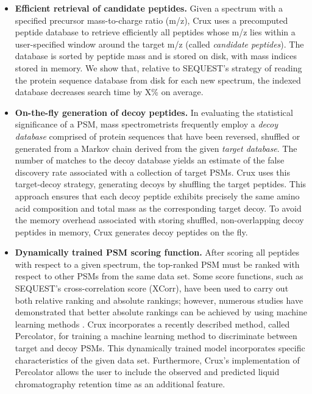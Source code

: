 \documentclass{bioinfo}
\begin{document}
\begin{itemize}

\item {\bf Efficient retrieval of candidate peptides.}  Given a
  spectrum with a specified precursor mass-to-charge ratio (m/z), Crux
  uses a precomputed peptide database to retrieve efficiently all
  peptides whose m/z lies within a user-specified window around the
  target m/z (called {\em candidate peptides}).  The database is
  sorted by peptide mass and is stored on disk, with mass indices
  stored in memory.  We show that, relative to SEQUEST's strategy of
  reading the protein sequence database from disk for each new
  spectrum, the indexed database decreases search time by X\% on
  average.

\item {\bf On-the-fly generation of decoy peptides.}  In evaluating
  the statistical significance of a PSM, mass spectrometrists
  frequently employ a {\em decoy database} comprised of protein
  sequences that have been reversed, shuffled or generated from a
  Markov chain derived from the given {\em target database}.  The
  number of matches to the decoy database yields an estimate of the
  false discovery rate associated with a collection of target PSMs.
  Crux uses this target-decoy strategy, generating decoys by shuffling
  the target peptides.  This approach ensures that each decoy peptide
  exhibits precisely the same amino acid composition and total mass as
  the corresponding target decoy.  To avoid the memory overhead
  associated with storing shuffled, non-overlapping decoy peptides in
  memory, Crux generates decoy peptides on the fly.

\item {\bf Dynamically trained PSM scoring function.}  After scoring
  all peptides with respect to a given spectrum, the top-ranked PSM
  must be ranked with respect to other PSMs from the same data set.
  Some score functions, such as SEQUEST's cross-correlation score
  (XCorr), have been used to carry out both relative ranking and
  absolute rankings; however, numerous studies have demonstrated that
  better absolute rankings can be achieved by using machine learning
  methods \cite{keller:empirical, anderson:new, elias:intensity,
  kall:semi-supervised}.  Crux incorporates a recently described
  method, called Percolator, for training a machine learning method to
  discriminate between target and decoy PSMs.  This dynamically
  trained model incorporates specific characteristics of the given
  data set.  Furthermore, Crux's implementation of Percolator allows
  the user to include the observed and predicted liquid chromatography
  retention time \cite{klammer:effect} as an additional feature.


\end{itemize}
\end{document}
